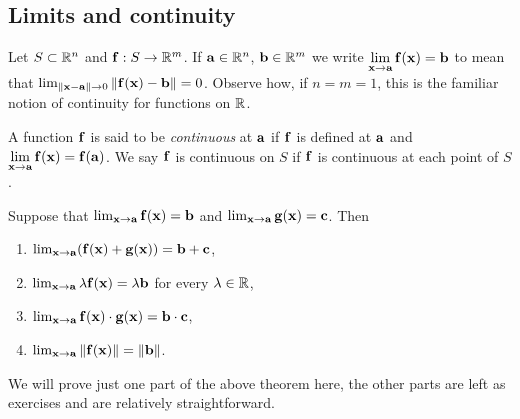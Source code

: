 \subsection*{Limits and continuity}

Let \(S\subset \bR^n\) and \(\ff : S \to \bR^m\).
If \(\aa\in \bR^n\), \(\bb\in \bR^m\) we write
    {\(  \displaystyle\lim_{\xx \to \aa}\ff(\xx) = \bb \)}
to mean that
\(\lim_{\norm{\xx-\aa}\to 0}\norm{\ff(\xx)-\bb}=0\).
Observe how, if \(n=m=1\), this is the familiar notion of continuity for functions on \(\bR\).

\begin{definition}[continuous]
    A function \(\ff\) is said to be \emph{continuous} at \(\aa\) if \(\ff\) is defined at \(\aa\) and
    \(  \displaystyle\lim_{\xx \to \aa}\ff(\xx) = \ff(\aa)\).
    We say \(\ff\) is continuous on \(S\) if \(\ff\) is continuous at each point of \(S\).
\end{definition}

\begin{theorem}
    Suppose that \(  \lim_{\xx \to \aa}\ff(\xx) = \bb\) and \(  \lim_{\xx \to \aa}\gg(\xx) = \cc\).
    Then
    \begin{enumerate}
        \item \(  \lim_{\xx \to \aa}(\ff(\xx)+\gg(\xx)) = \bb+\cc\),
        \item \(  \lim_{\xx \to \aa} \lambda \ff(\xx) = \lambda \bb\) for every \(\lambda \in \bR\),
        \item \(  \lim_{\xx \to \aa}\ff(\xx)\cdot \gg(\xx) = \bb\cdot \cc\),
        \item \(  \lim_{\xx \to \aa} \norm{\ff(\xx)} = \norm{\bb}\).
    \end{enumerate}
\end{theorem}

We will prove just one part of the above theorem here, the other parts are left as exercises and are relatively straightforward.

